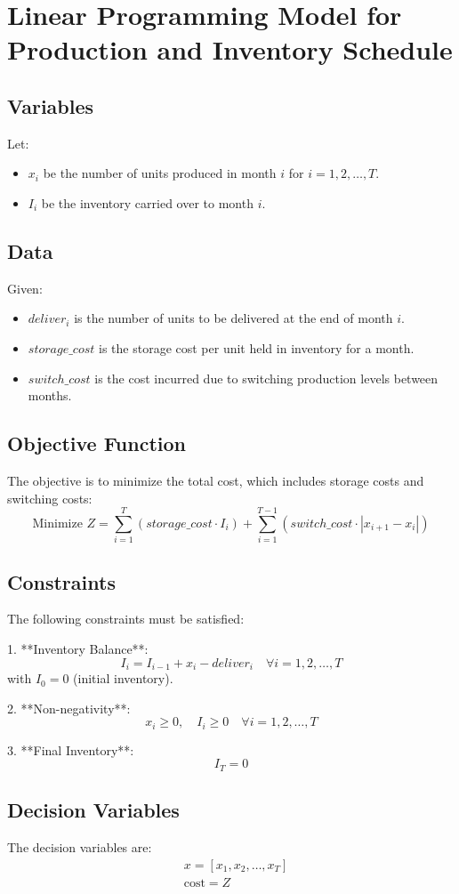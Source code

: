 \documentclass{article}
\begin{document}
\section*{Linear Programming Model for Production and Inventory Schedule}

\subsection*{Variables}
Let:
\begin{itemize}
    \item $x_i$ be the number of units produced in month $i$ for $i = 1, 2, \ldots, T$.
    \item $I_i$ be the inventory carried over to month $i$.
\end{itemize}

\subsection*{Data}
Given:
\begin{itemize}
    \item $deliver_i$ is the number of units to be delivered at the end of month $i$.
    \item $storage\_cost$ is the storage cost per unit held in inventory for a month.
    \item $switch\_cost$ is the cost incurred due to switching production levels between months.
\end{itemize}

\subsection*{Objective Function}
The objective is to minimize the total cost, which includes storage costs and switching costs:
\[
\text{Minimize } Z = \sum_{i=1}^{T} (storage\_cost \cdot I_i) + \sum_{i=1}^{T-1} (switch\_cost \cdot |x_{i+1} - x_i|)
\]

\subsection*{Constraints}
The following constraints must be satisfied:

1. **Inventory Balance**:
   \[
   I_i = I_{i-1} + x_i - deliver_i \quad \forall i = 1, 2, \ldots, T
   \]
   with \( I_0 = 0 \) (initial inventory).

2. **Non-negativity**:
   \[
   x_i \geq 0, \quad I_i \geq 0 \quad \forall i = 1, 2, \ldots, T
   \]

3. **Final Inventory**:
   \[
   I_T = 0
   \]

\subsection*{Decision Variables}
The decision variables are:
\[
\begin{align*}
& x = [x_1, x_2, \ldots, x_T] \\
& \text{cost} = Z
\end{align*}
\]
\end{document}
